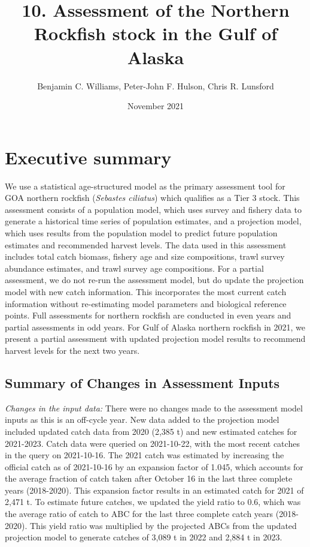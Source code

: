 \documentclass[
  11pt,
]{article}
\title{10. Assessment of the Northern Rockfish stock in the Gulf of Alaska}
\author{Benjamin C. Williams, Peter-John F. Hulson, Chris R. Lunsford}
\date{November 2021}
\begin{document}
\maketitle


\hypertarget{executive-summary}{%
\section{Executive summary}\label{executive-summary}}

We use a statistical age-structured model as the primary assessment tool for GOA northern rockfish (\emph{Sebastes ciliatus}) which qualifies as a Tier 3 stock.
This assessment consists of a population model, which uses survey and fishery data to generate a historical time series of population estimates, and a projection model, which uses results from the population model to predict future population estimates and recommended harvest levels.
The data used in this assessment includes total catch biomass, fishery age and size compositions, trawl survey abundance estimates, and trawl survey age compositions.
For a partial assessment, we do not re-run the assessment model, but do update the projection model with new catch information.
This incorporates the most current catch information without re-estimating model parameters and biological reference points.
Full assessments for northern rockfish are conducted in even years and partial assessments in odd years.
For Gulf of Alaska northern rockfish in 2021, we present a partial assessment with updated projection model results to recommend harvest levels for the next two years.

\allsectionsfont{\raggedright}

\hypertarget{summary-of-changes-in-assessment-inputs}{%
\subsection{Summary of Changes in Assessment Inputs}\label{summary-of-changes-in-assessment-inputs}}

\emph{Changes in the input data:} There were no changes made to the assessment model inputs as this is an off-cycle year.
New data added to the projection model included updated catch data from 2020 (2,385 t) and new estimated catches for 2021-2023.
Catch data were queried on 2021-10-22, with the most recent catches in the query on 2021-10-16.
The 2021 catch was estimated by increasing the official catch as of 2021-10-16 by an expansion factor of 1.045, which accounts for the average fraction of catch taken after October 16 in the last three complete years (2018-2020).
This expansion factor results in an estimated catch for 2021 of 2,471 t.
To estimate future catches, we updated the yield ratio to 0.6, which was the average ratio of catch to ABC for the last three complete catch years (2018-2020).
This yield ratio was multiplied by the projected ABCs from the updated projection model to generate catches of 3,089 t in 2022 and 2,884 t in 2023.
\end{document}
